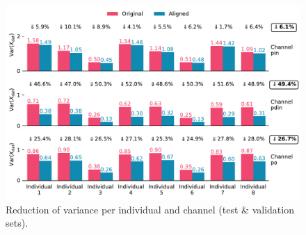 \begin{figure}[!htb]
    \begin{center}
    \centerline{\includegraphics[width=\linewidth]{figures/results_variance_ext.pdf}}
    \vspace{-0.3cm}
    \caption{Reduction of variance per individual and channel (test \& validation sets).}
    \label{fig:phm_variance}
    \end{center}
    \vspace{-1cm}
\end{figure}


